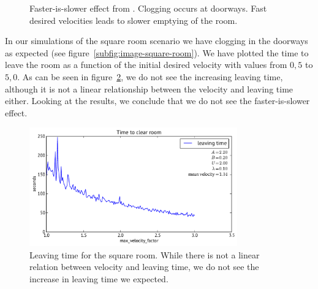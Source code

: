 \begin{figure}[ht]
    \centering
    \caption[Faster-is-slower effect from \cite{helbing00}]{Faster-is-slower 
    effect from \cite{helbing00}.  Clogging 
    occurs at doorways.  Fast desired 
    velocities leads to slower emptying of the room.}
    \label{fig:LtNFasterIsSlower}
\end{figure}

In our simulations of the square room scenario we have clogging in the 
doorways as expected (see figure~\ref{subfig:image-square-room}). We have 
plotted the time to leave the room as a function of the initial desired 
velocity with values from $0,5$ to $5,0$. As can be seen in 
figure~\ref{fig:square-room-leaving}, we do not see the increasing leaving 
time, although it is not a linear relationship between the velocity and 
leaving time either. Looking at the results, we conclude that we  do not see 
the faster-is-slower effect.

\begin{figure}[ht]
    \centering
    \includegraphics[width=0.8\textwidth]{Figures/fastIsSlowNot.pdf}
    \caption[Leaving time for the square room]{Leaving time for the square 
    room. While there is not a linear relation between velocity and leaving 
    time, we do not see the increase in leaving time we expected.}
    \label{fig:square-room-leaving}
\end{figure}

